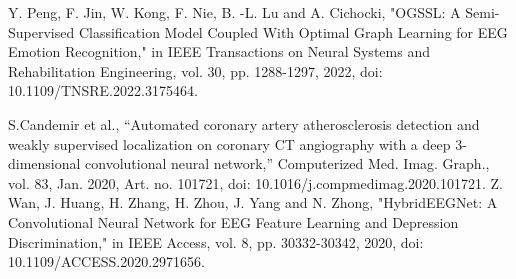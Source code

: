 \documentclass[conference]{IEEEtran}
\begin{document}
\begin{thebibliography}{00}


 Y. Peng, F. Jin, W. Kong, F. Nie, B. -L. Lu and A. Cichocki, "OGSSL: A Semi-Supervised Classification Model Coupled With Optimal Graph Learning for EEG Emotion Recognition," in IEEE Transactions on Neural Systems and Rehabilitation Engineering, vol. 30, pp. 1288-1297, 2022, doi: 10.1109/TNSRE.2022.3175464.

 S.Candemir et al., “Automated coronary artery atherosclerosis detection and weakly supervised localization on coronary CT angiography with a deep 3-dimensional convolutional neural network,” Computerized Med. Imag. Graph., vol. 83, Jan. 2020, Art. no. 101721,
doi: 10.1016/j.compmedimag.2020.101721.
Z. Wan, J. Huang, H. Zhang, H. Zhou, J. Yang and N. Zhong, "HybridEEGNet: A Convolutional Neural Network for EEG Feature Learning and Depression Discrimination," in IEEE Access, vol. 8, pp. 30332-30342, 2020, doi: 10.1109/ACCESS.2020.2971656.


\end{thebibliography}
\end{document}
